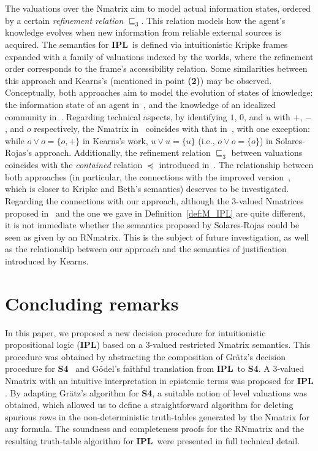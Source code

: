\documentclass[12pt]{article}
\newcommand{\ipl}{\ensuremath{\mathbf{IPL}}}
\newcommand{\sfo}{\textbf{S4}}
\begin{document}
The valuations over the Nmatrix aim to model actual information states, ordered by a certain {\em refinement relation} $\sqsubseteq_3$.
This relation models how the agent's knowledge evolves when new information from reliable external sources is acquired. 
The semantics for \ipl\ is defined via intuitionistic Kripke frames expanded with a family of valuations indexed by the worlds, where the refinement order corresponds to the frame's accessibility relation. Some similarities between this approach and Kearns's (mentioned in point {\bf (2)}) may be observed.
Conceptually, both approaches aim to model the evolution of states of knowledge: the information state of an agent in~\cite{Solares-Rojas}, and the knowledge of an idealized community in~\cite{kearns:78,kearns:IPL:81}. Regarding technical aspects, by identifying $1$, $0$, and $u$ with $+$, $-$, and $o$ respectively, the Nmatrix in~\cite[Chapter~5]{Solares-Rojas} coincides with that in~\cite{kearns:78}, with one exception: while $o \vee o = \{o, +\}$ in Kearns's work, $u \vee u = \{u\}$ (i.e., $o \vee o = \{o\}$) in Solares-Rojas's approach. Additionally, the refinement relation $\sqsubseteq_3$ between valuations coincides with the {\em contained} relation $\preceq$ introduced in~\cite{kearns:78}.
The relationship between both approaches (in particular, the connections with the improved version~\cite{kearns:IPL:81}, which is closer to Kripke and Beth's semantics) deserves to be investigated. Regarding the connections with our approach, although the 3-valued Nmatrices proposed in~\cite[Chapter~5]{Solares-Rojas} and the one we gave in Definition~\ref{def:M_IPL} are quite different, it is not immediate whether the semantics proposed by Solares-Rojas could be seen as given by an RNmatrix. This is the subject of future investigation, as well as the relationship between our approach and the semantics of justification introduced by Kearns.



\section{Concluding remarks} \label{final_remarks}

In this paper, we proposed a new decision procedure for intuitionistic propositional logic (\ipl) based on a 3-valued restricted Nmatrix semantics. This procedure was obtained by abstracting the composition of Gr\"atz's decision procedure for \sfo~\cite{gratz_truth_2022} and G\"odel's faithful translation from \ipl\ to \sfo. A 3-valued Nmatrix with an intuitive interpretation in epistemic terms was proposed for \ipl. By adapting Gr\"atz's algorithm for \sfo, a suitable notion of level valuations was obtained, which allowed us to define a straightforward algorithm for deleting spurious rows in the non-deterministic truth-tables generated by the Nmatrix for any formula. The soundness and completeness proofs for the RNmatrix and the resulting truth-table algorithm for \ipl\ were presented in full technical detail.
\end{document}
